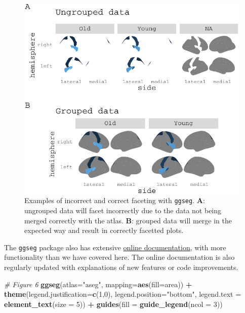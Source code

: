 \documentclass[fleqn,10pt]{wlpeerj} %
\newenvironment{Shaded}{\begin{snugshade}}{\end{snugshade}}
\newcommand{\CommentTok}[1]{\textcolor[rgb]{0.56,0.35,0.01}{\textit{#1}}}
\newcommand{\DataTypeTok}[1]{\textcolor[rgb]{0.13,0.29,0.53}{#1}}
\newcommand{\DecValTok}[1]{\textcolor[rgb]{0.00,0.00,0.81}{#1}}
\newcommand{\KeywordTok}[1]{\textcolor[rgb]{0.13,0.29,0.53}{\textbf{#1}}}
\newcommand{\NormalTok}[1]{#1}
\newcommand{\OperatorTok}[1]{\textcolor[rgb]{0.81,0.36,0.00}{\textbf{#1}}}
\newcommand{\StringTok}[1]{\textcolor[rgb]{0.31,0.60,0.02}{#1}}
\begin{document}
\begin{figure}[H]
\includegraphics[width=1\linewidth]{msc_ggseg_files/figure-latex/datasupp3-1} \caption{Examples of incorrect and correct faceting with \texttt{ggseg}. \textbf{A}: ungrouped data will facet incorrectly due to the data not being merged correctly with the atlas. \textbf{B}: grouped data will merge in the expected way and result in correctly facetted plots.}\label{fig:datasupp3}
\end{figure}

The \texttt{ggseg} package also has extensive \href{https://lcbc-uio.github.io/ggseg/}{online documentation}, with more functionality than we have covered here.
The online documentation is also regularly updated with explanations of new features or code improvements.

\begin{Shaded}
\begin{Highlighting}[]
\CommentTok{\# Figure 6}
\KeywordTok{ggseg}\NormalTok{(}\DataTypeTok{atlas=}\StringTok{"aseg"}\NormalTok{, }\DataTypeTok{mapping=}\KeywordTok{aes}\NormalTok{(}\DataTypeTok{fill=}\NormalTok{area)) }\OperatorTok{+}
\StringTok{  }\KeywordTok{theme}\NormalTok{(}\DataTypeTok{legend.justification=}\KeywordTok{c}\NormalTok{(}\DecValTok{1}\NormalTok{,}\DecValTok{0}\NormalTok{),}
        \DataTypeTok{legend.position=}\StringTok{"bottom"}\NormalTok{,}
        \DataTypeTok{legend.text =} \KeywordTok{element\_text}\NormalTok{(}\DataTypeTok{size =} \DecValTok{5}\NormalTok{)) }\OperatorTok{+}
\StringTok{  }\KeywordTok{guides}\NormalTok{(}\DataTypeTok{fill =} \KeywordTok{guide\_legend}\NormalTok{(}\DataTypeTok{ncol =} \DecValTok{3}\NormalTok{))}
\end{Highlighting}
\end{Shaded}
\end{document}
